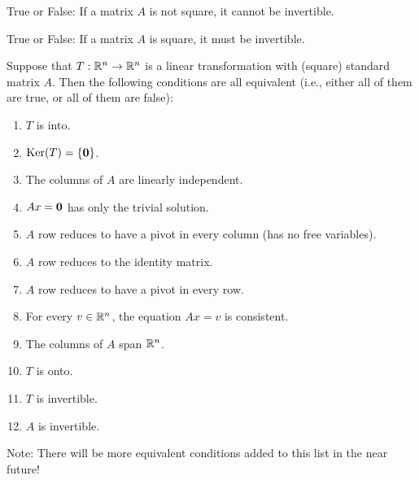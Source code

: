 True or False: If a matrix $A$ is not square, it cannot be invertible.  


True or False: If a matrix $A$ is square, it must be invertible.  



\endedxproblem


\endedxvertical






{}  Suppose that $T: \mathbb R^n \rightarrow \mathbb R^n$ is a linear transformation
with (square) standard matrix $A$.  Then the following conditions are all equivalent (i.e., either all of
them are true, or all of them are false):

\begin{enumerate}
\item $T$ is into.
\item $\mathrm{Ker}(T) = \{ \mathbf{0} \}$.  
\item The columns of $A$ are linearly independent. 
\item $Ax = \mathbf{0}$ has only the trivial solution.
\item $A$ row reduces to have a pivot in every column (has no free variables).  
\item $A$ row reduces to the identity matrix.  
\item $A$ row reduces to have a pivot in every row.  
\item For every $v\in \mathbb R^n$, the equation $Ax = v$ is consistent.
\item The columns of $A$ span $\mathbb R^n$.  
\item $T$ is onto.  
\item $T$ is invertible.
\item $A$ is invertible.

\end{enumerate}

Note: There will be more equivalent conditions added to this list in the near future!  


\endedxtext



